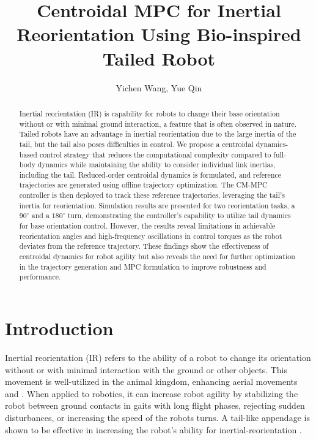 \documentclass[conference]{IEEEtran}
\begin{document}
\title{Centroidal MPC for Inertial Reorientation Using
Bio-inspired Tailed Robot}

\author{Yichen Wang, Yue Qin
}

\maketitle

\begin{abstract}
    Inertial reorientation (IR) is capability for robots to change their base orientation without or with minimal ground interaction, a feature that is often observed in nature. Tailed robots have an advantage in inertial reorientation due to the large inertia of the tail, but the tail also poses difficulties in control. We propose a centroidal dynamics-based control strategy that reduces the computational complexity compared to full-body dynamics while maintaining the ability to consider individual link inertias, including the tail. Reduced-order centroidal dynamics is formulated, and reference trajectories are generated using offline trajectory optimization. The CM-MPC controller is then deployed to track these reference trajectories, leveraging the tail's inertia for reorientation. Simulation results are presented for two reorientation tasks, a $90^\circ$ and a $180^\circ$ turn, demonstrating the controller's capability to utilize tail dynamics for base orientation control. However, the results reveal limitations in achievable reorientation angles and high-frequency oscillations in control torques as the robot deviates from the reference trajectory. These findings show the effectiveness of centroidal dynamics for robot agility but also reveals the need for further optimization in the trajectory generation and MPC formulation to improve robustness and performance.
\end{abstract}



\section{Introduction}

Inertial reorientation (IR) refers to the ability of a robot to change its orientation without or with minimal interaction with the ground or other objects. This movement is well-utilized in the animal kingdom, enhancing aerial movements and  \cite{jusufi2008active}. When applied to robotics, it can increase robot agility by stabilizing the robot between ground contacts in gaits with long flight phases, rejecting sudden disturbances, or increasing the speed of the robots turns. A tail-like appendage is shown to be effective in increasing the robot's ability for inertial-reorientation \cite{libby2016tail, fu2025jointed, an2024morphable}.
\end{document}
